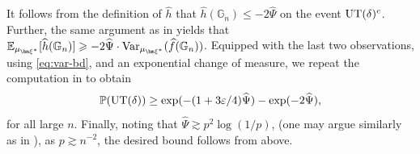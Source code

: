 \documentclass[a4paper,11pt,english,reqno]{amsart}
\numberwithin{equation}{section}
\renewcommand{\leq}{\leqslant}
\renewcommand{\geq}{\geqslant}
\newcommand{\E}{\mathbb{E}}
\newcommand{\UT}{\textup{UT}(\delta)}
\renewcommand{\P}{\mathbb{P}}
\newcommand{\G}{\mathbb{G}}
\newcommand{\tu}[1]{\textup{#1}}
\newcommand{\blue}[1]{{\color{blue} #1}}
\begin{document}
It follows from the definition of $\widehat h$ that $\widehat{h}(\G_n)\leq -2\widehat{\Psi}$ on the event $\UT^{c}$. 
Further, the same argument as in \cite[p.~942]{AB} yields that $\E_{\mu_{\bm \xi^{*}}}[\widehat{h}(\G_n)]\geq -2\widehat{\Psi}\cdot \tu{Var}_{\mu_{\bm \xi^{*}}}(\widehat{f}(\G_n))$.
Equipped with the last two observations, %
using \eqref{eq:var-bd}, and an exponential change of measure, we repeat the computation in \cite[Eqn.~(5.17)]{AB} to obtain
\[
\P(\UT) \ge \exp(-(1+3\varepsilon/4)\widehat \Psi) - \exp(-2 \widehat \Psi),
\]
for all large $n$. Finally, noting that $\widehat\Psi\gtrsim p^{2}\log(1/p)$, (one may argue similarly as in   \cite[Lemma~5.2]{AB}), as $p \gtrsim n^{-2}$, the desired bound follows from above.

	
\end{document}
